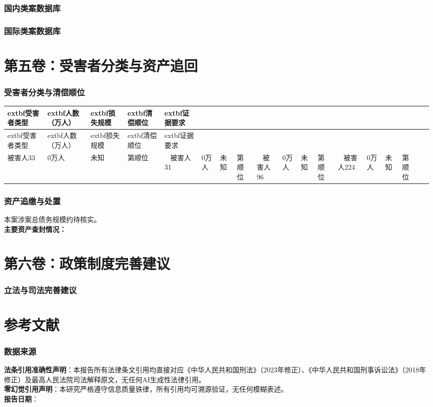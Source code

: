 \documentclass[11pt,a4paper,oneside]{article}
\begin{document}
\section{国内类案数据库}
\section{国际类案数据库}\part{第五卷：受害者分类与资产追回}
\section{受害者分类与清偿顺位}\begin{longtable}{|p{2.5cm}|p{2cm}|p{2.5cm}|p{2cm}|p{4.5cm}|}
\toprule
	extbf{受害者类型} & 	extbf{人数（万人）} & 	extbf{损失规模} & 	extbf{清偿顺位} & 	extbf{证据要求} \\
\midrule
\endfirsthead
	extbf{受害者类型} & 	extbf{人数（万人）} & 	extbf{损失规模} & 	extbf{清偿顺位} & 	extbf{证据要求} \\
\midrule
\endhead
被害人33 & 0万人 & 未知 & 第顺位 &  \
\midrule
被害人31 & 0万人 & 未知 & 第顺位 &  \
\midrule
被害人96 & 0万人 & 未知 & 第顺位 &  \
\midrule
被害人224 & 0万人 & 未知 & 第顺位 &  \
\midrule
\bottomrule
\end{longtable}\section{资产追缴与处置}
本案涉案总债务规模约待核实。\\\textbf{主要资产查封情况：}\part{第六卷：政策制度完善建议}
\section{立法与司法完善建议}
\part{参考文献}
\section{数据来源}
\vfill
\noindent\textbf{法条引用准确性声明}：本报告所有法律条文引用均直接对应《中华人民共和国刑法》（2023年修正）、《中华人民共和国刑事诉讼法》（2018年修正）及最高人民法院司法解释原文，无任何AI生成性法律引用。\\\textbf{零幻觉引用声明}：本研究严格遵守信息质量铁律，所有引用均可溯源验证，无任何模糊表述。\\\textbf{报告日期}：
\end{document}
